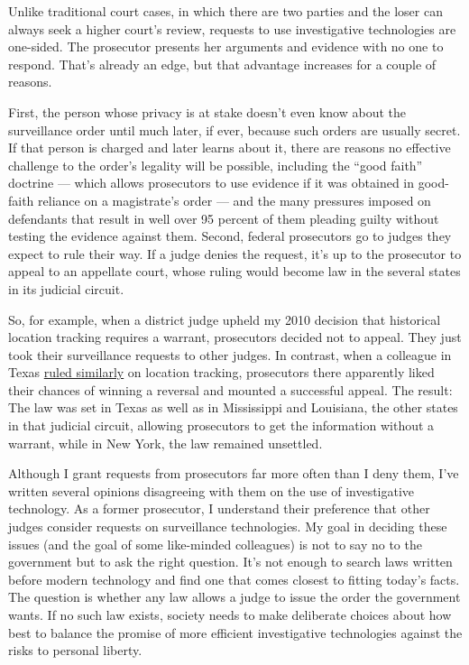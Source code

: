 Unlike traditional court cases, in which there are two parties and the
loser can always seek a higher court's review, requests to use
investigative technologies are one-sided. The prosecutor presents her
arguments and evidence with no one to respond. That's already an edge,
but that advantage increases for a couple of reasons.

First, the person whose privacy is at stake doesn't even know about the
surveillance order until much later, if ever, because such orders are
usually secret. If that person is charged and later learns about it,
there are reasons no effective challenge to the order's legality will be
possible, including the ``good faith'' doctrine --- which allows
prosecutors to use evidence if it was obtained in good-faith reliance on
a magistrate's order --- and the many pressures imposed on defendants
that result in well over 95 percent of them pleading guilty without
testing the evidence against them. Second, federal prosecutors go to
judges they expect to rule their way. If a judge denies the request,
it's up to the prosecutor to appeal to an appellate court, whose ruling
would become law in the several states in its judicial circuit.

So, for example, when a district judge upheld my 2010 decision that
historical location tracking requires a warrant, prosecutors decided not
to appeal. They just took their surveillance requests to other judges.
In contrast, when a colleague in Texas
\href{https://www.eff.org/cases/fifth-circuit-cell-phone-tracking-case}{ruled
similarly} on location tracking, prosecutors there apparently liked
their chances of winning a reversal and mounted a successful appeal. The
result: The law was set in Texas as well as in Mississippi and
Louisiana, the other states in that judicial circuit, allowing
prosecutors to get the information without a warrant, while in New York,
the law remained unsettled.

Although I grant requests from prosecutors far more often than I deny
them, I've written several opinions disagreeing with them on the use of
investigative technology. As a former prosecutor, I understand their
preference that other judges consider requests on surveillance
technologies. My goal in deciding these issues (and the goal of some
like-minded colleagues) is not to say no to the government but to ask
the right question. It's not enough to search laws written before modern
technology and find one that comes closest to fitting today's facts. The
question is whether any law allows a judge to issue the order the
government wants. If no such law exists, society needs to make
deliberate choices about how best to balance the promise of more
efficient investigative technologies against the risks to personal
liberty.

